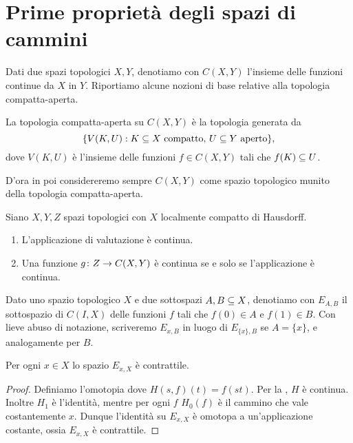 \section{Prime proprietà degli spazi di cammini}
Dati due spazi topologici $X,Y$, denotiamo con $C(X,Y)$ l'insieme delle funzioni continue da $X$ in $Y$. Riportiamo alcune nozioni di base relative alla topologia compatta-aperta.
\begin{definition}
La topologia compatta-aperta su $C(X,Y)$ è la topologia generata da 
$$
\{V(K,U):\text{$K\subseteq X$ compatto, $U\subseteq Y$ aperto}\},
$$
dove $V(K,U)$ è l'insieme delle funzioni $f\in C(X,Y)$ tali che $f(K)\subseteq U$.
\end{definition}
D'ora in poi considereremo sempre $C(X,Y)$ come spazio topologico munito della topologia compatta-aperta.
\begin{proposition}
Siano $X,Y,Z$ spazi topologici con $X$ localmente compatto di Hausdorff.
\begin{enumerate}
\item L'applicazione di valutazione
è continua.
\item Una funzione $g\colon Z\to C(X,Y)$ è continua se e solo se l'applicazione
è continua.
\end{enumerate}
\end{proposition}

Dato uno spazio topologico $X$ e due sottospazi $A,B\subseteq X$, denotiamo con $E_{A,B}$ il sottospazio di $C(I,X)$ delle funzioni $f$ tali che $f(0)\in A$ e $f(1)\in B$. Con lieve abuso di notazione, scriveremo $E_{x,B}$ in luogo di $E_{\{x\},B}$ se $A=\{x\}$, e analogamente per $B$.

\begin{proposition}
Per ogni $x\in X$ lo spazio $E_{x,X}$ è contrattile.
\end{proposition}
\begin{proof}
Definiamo l'omotopia
dove $H(s,f)(t)=f(st)$. Per la , $H$ è continua. Inoltre $H_1$ è l'identità, mentre per ogni $f$ $H_0(f)$ è il cammino che vale costantemente $x$. Dunque l'identità su $E_{x,X}$ è omotopa a un'applicazione costante, ossia $E_{x,X}$ è contrattile.
\end{proof}

